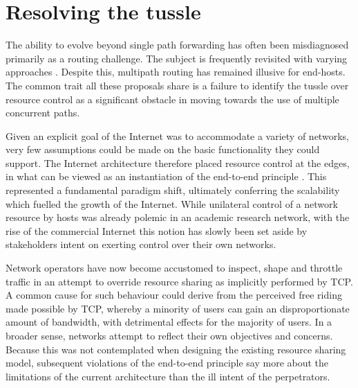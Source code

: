 \section{Resolving the tussle}

The ability to evolve beyond single path forwarding has often been misdiagnosed primarily as a routing challenge. 
The subject is frequently revisited with varying approaches \cite{Sunshine:1977p152,Yang:2003p136,Yang:2006p405,Godfrey:2009p36}. 
Despite this, multipath routing has remained illusive for end-hosts. 
The common trait all these proposals share is a failure to identify the tussle over resource control as a significant obstacle in moving towards the use of multiple concurrent paths.

Given an explicit goal of the Internet was to accommodate a variety of networks, very few assumptions could be made on the basic functionality they could support.
The Internet architecture therefore placed resource control at the edges, in what can be viewed as an instantiation of the end-to-end principle \cite{Saltzer:1984p305}. 
This represented a fundamental paradigm shift, ultimately conferring the scalability which fuelled the growth of the Internet.  
While unilateral control of a network resource by hosts was already polemic in an academic research network, with the rise of the commercial Internet this notion has slowly been set aside by stakeholders intent on exerting control over their own networks.

Network operators have now become accustomed to inspect, shape and throttle traffic in an attempt to override resource sharing as implicitly performed by \ac{TCP}. 
A common cause for such behaviour could derive from the perceived free riding made possible by \ac{TCP}, whereby a minority of users can gain an disproportionate amount of bandwidth, with detrimental effects for the majority of users. 
In a broader sense, networks attempt to reflect their own objectives and concerns. 
Because this was not contemplated when designing the existing resource sharing model, subsequent violations of the end-to-end principle say more about the limitations of the current architecture than the ill intent of the perpetrators. 

